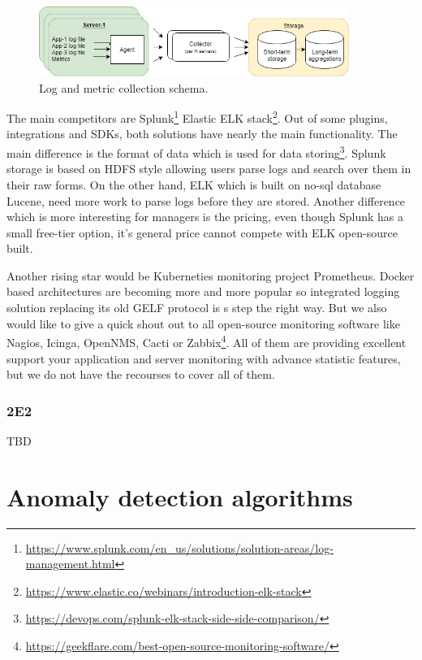 \begin{figure}[h]
    \centering
    \includegraphics[width=0.9\textwidth]{figures/stateOfTheArt/logCollectionSchema.png}
    \caption{Log and metric collection schema.}
    \label{fig:sota_logCollection_schema}
\end{figure}

The main competitors are Splunk\footnote{\url{https://www.splunk.com/en_us/solutions/solution-areas/log-management.html}} Elastic ELK stack\footnote{\url{https://www.elastic.co/webinars/introduction-elk-stack}}. Out of some plugins, integrations and SDKs, both solutions have nearly the main functionality. The main difference is the format of data which is used for data storing\footnote{\url{https://devops.com/splunk-elk-stack-side-side-comparison/}}. Splunk storage is based on HDFS \cite{sanjay2003google, shvachko2010hadoop} style allowing users parse logs and search over them in their raw forms. On the other hand, ELK which is built on no-sql database Lucene, need more work to parse logs before they are stored. Another difference which is more interesting for managers is the pricing, even though Splunk has a small free-tier option, it’s general price cannot compete with ELK open-source built. 

Another rising star would be Kuberneties monitoring project Prometheus. Docker based architectures are becoming more and more popular so integrated logging solution replacing its old GELF protocol is s step the right way. But we also would like to give a quick shout out to all open-source monitoring software like Nagios, Icinga, OpenNMS, Cacti or Zabbix\footnote{\url{https://geekflare.com/best-open-source-monitoring-software/}}. All of them are providing excellent support your application and server monitoring with advance statistic features, but we do not have the recourses to cover all of them.

\subsubsection{2E2}

TBD

\section{Anomaly detection algorithms}


